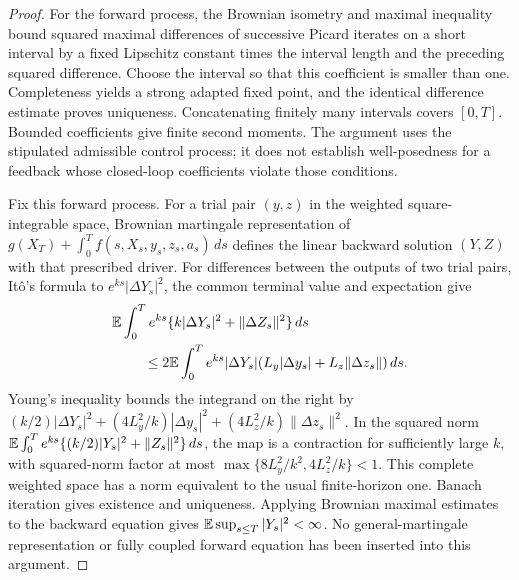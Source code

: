 \begin{proof}
For the forward process, the Brownian isometry and maximal inequality bound squared maximal differences of successive Picard iterates on a short interval by a fixed Lipschitz constant times the interval length and the preceding squared difference. Choose the interval so that this coefficient is smaller than one. Completeness yields a strong adapted fixed point, and the identical difference estimate proves uniqueness. Concatenating finitely many intervals covers $[0,T]$. Bounded coefficients give finite second moments. The argument uses the stipulated admissible control process; it does not establish well-posedness for a feedback whose closed-loop coefficients violate those conditions.

Fix this forward process. For a trial pair $(y,z)$ in the weighted square-integrable space, Brownian martingale representation of
$g(X_T)+\int_0^T f(s,X_s,y_s,z_s,a_s)\,ds$
defines the linear backward solution $(Y,Z)$ with that prescribed driver. For differences between the outputs of two trial pairs, It\^o's formula to $e^{ks}|\Delta Y_s|^2$, the common terminal value and expectation give
\begin{align*}
 &\mathbb E\int_0^T e^{ks}\{k|\Delta Y_s|^2+\|\Delta Z_s\|^2\}\,ds\\
 &\hspace{8mm}\le2\mathbb E\int_0^T e^{ks}|\Delta Y_s|
       (L_y|\Delta y_s|+L_z\|\Delta z_s\|)\,ds.
\end{align*}
Young's inequality bounds the integrand on the right by
$(k/2)|\Delta Y_s|^2+(4L_y^2/k)|\Delta y_s|^2+(4L_z^2/k)\|\Delta z_s\|^2$.
In the squared norm
$\mathbb E\int_0^Te^{ks}\{(k/2)|Y_s|^2+\|Z_s\|^2\}\,ds$,
the map is a contraction for sufficiently large $k$, with squared-norm factor at most
$\max\{8L_y^2/k^2,4L_z^2/k\}<1$.
This complete weighted space has a norm equivalent to the usual finite-horizon one. Banach iteration gives existence and uniqueness. Applying Brownian maximal estimates to the backward equation gives $\mathbb E\sup_{s\le T}|Y_s|^2<\infty$. No general-martingale representation or fully coupled forward equation has been inserted into this argument.


\end{proof}
